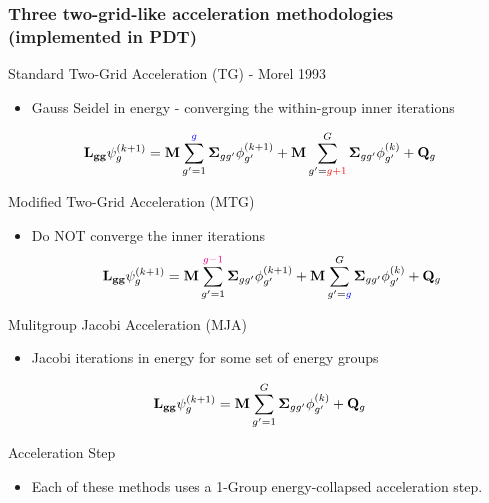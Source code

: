\documentclass[compress,10pt]{beamer}
\newcommand{\tcr}[1]{\textcolor{red}{#1}}
\newcommand{\tcb}[1]{\textcolor{blue}{#1}}
\newcommand{\tcm}[1]{\textcolor{magenta}{#1}}
\begin{document}
\begin{frame}[t]\frametitle{\small Three two-grid-like acceleration methodologies (implemented in PDT)}{\footnotesize
\vspace{-2.5mm}
\begin{block}{Standard Two-Grid Acceleration (TG) - Morel 1993}
\begin{itemize}
\item Gauss Seidel in energy - converging the within-group inner iterations
\end{itemize}
\begin{equation*}
{\bf L_{gg}} \psi_g^{(k+1)} = {\bf M} \sum_{g'=1}^{\tcb{g}} {\bf \Sigma}_{g g'} \phi_{g'}^{(k+1)} + {\bf M} \sum_{g'=\tcr{g+1}}^G {\bf \Sigma}_{g g'} \phi_{g'}^{(k)} + {\bf Q}_g
\end{equation*}
\end{block}
\vspace{-2.5mm}
\begin{block}{Modified Two-Grid Acceleration (MTG)}
\begin{itemize}
\item Do NOT converge the inner iterations
\begin{equation*}
{\bf L_{gg}} \psi_g^{(k+1)} = {\bf M} \sum_{g'=1}^{\tcm{g-1}} {\bf \Sigma}_{g g'} \phi_{g'}^{(k+1)} + {\bf M} \sum_{g'=\tcb{g}}^G {\bf \Sigma}_{g g'} \phi_{g'}^{(k)} + {\bf Q}_g
\end{equation*}
\end{itemize}
\end{block}
\vspace{-2.5mm}
\begin{block}{Mulitgroup Jacobi Acceleration (MJA)}
\begin{itemize}
\item Jacobi iterations in energy for some set of energy groups
\end{itemize}
\begin{equation*}
{\bf L_{gg}} \psi_g^{(k+1)} = {\bf M} \sum_{g'=1}^G {\bf \Sigma}_{g g'} \phi_{g'}^{(k)} + {\bf Q}_g
\end{equation*}
\end{block}
\vspace{-2.5mm}
\begin{block}{Acceleration Step}
\begin{itemize}
\item Each of these methods uses a 1-Group energy-collapsed acceleration step.
\end{itemize}
\end{block}
}
\end{frame}
\end{document}
